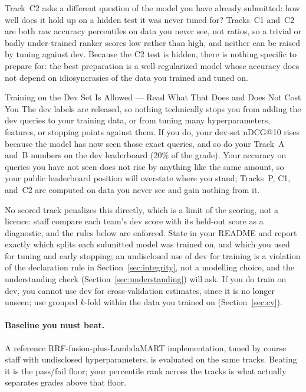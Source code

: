 \documentclass[10pt]{article}
\begin{document}
Track~C2 asks a different question of the model you have already submitted: how well does it hold up on a hidden test it was never tuned for? Tracks~C1 and~C2 are both raw accuracy percentiles on data you never see, not ratios, so a trivial or badly under-trained ranker scores low rather than high, and neither can be raised by tuning against dev. Because the C2 test is hidden, there is nothing specific to prepare for: the best preparation is a well-regularized model whose accuracy does not depend on idiosyncrasies of the data you trained and tuned on.

\begin{mybox}{{Training on the Dev Set Is Allowed --- Read What That Does and Does Not Cost You}}
The dev labels are released, so nothing technically stops you from adding the dev queries to your training data, or from tuning many hyperparameters, features, or stopping points against them. If you do, your dev-set nDCG@10 rises because the model has now seen those exact queries, and so do your Track~A and~B numbers on the dev leaderboard (20\% of the grade). Your accuracy on queries you have not seen does not rise by anything like the same amount, so your public leaderboard position will overstate where you stand; Tracks~P, C1, and~C2 are computed on data you never see and gain nothing from it.

No scored track penalizes this directly, which is a limit of the scoring, not a licence: staff compare each team's dev score with its held-out score as a diagnostic, and the rules below are enforced. State in your README and report exactly which splits each submitted model was trained on, and which you used for tuning and early stopping; an undisclosed use of dev for training is a violation of the declaration rule in Section~\ref{sec:integrity}, not a modelling choice, and the understanding check (Section~\ref{sec:understanding}) will ask. If you do train on dev, you cannot use dev for cross-validation estimates, since it is no longer unseen; use grouped \(k\)-fold within the data you trained on (Section~\ref{sec:cv}).
\end{mybox}

\paragraph{Baseline you must beat.}
A reference RRF-fusion-plus-LambdaMART implementation, tuned by course staff with undisclosed hyperparameters, is evaluated on the same tracks. Beating it is the pass/fail floor; your percentile rank across the tracks is what actually separates grades above that floor.
\end{document}
